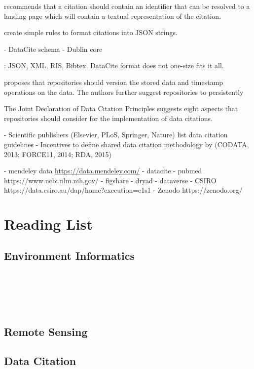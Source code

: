 \documentclass[a4paper,10pt]{article}
\begin{document}
\citep{AltKin07} recommends that a citation should contain an identifier that can be resolved to a landing page which will contain a textual representation of the citation.

\citep{Buneman2016} create simple rules to format citations into JSON strings.



- DataCite schema 
- Dublin core

\citep{Alawini2017}: JSON, XML, RIS, Bibtex. 
DataCite format does not one-size fits it all.

\cite{Rauber2015} proposes that repositories should version the stored data and timestamp operations on the data. The authors further suggest repositories to persistently 

The Joint Declaration of Data Citation Principles \citep{Altman2015, Starr2015} suggests eight aspects that repositories should consider for the implementation of data citations.

- Scientific publishers (Elsevier, PLoS, Springer, Nature) list data citation guidelines \citep{Silvello2017}
- Incentives to define shared data citation methodology by
(CODATA, 2013; FORCE11, 2014; RDA, 2015)


  - mendeley data \url{https://data.mendeley.com/}  
  - datacite
  - pubmed \url{https://www.ncbi.nlm.nih.gov/}
  - figshare
  - dryad
  - dataverse
  - CSIRO https://data.csiro.au/dap/home?execution=e1s1
  - Zenodo https://zenodo.org/


\newpage
\section{Reading List}

\subsection{Environment Informatics}
\cite{Frew2012} \\
\cite{Foster2017} \\
\cite{Frew2004} \\
\cite{Hey2009} \\


\subsection{Remote Sensing}

\subsection{Data Citation}
\cite{Silvello2017}
\end{document}
